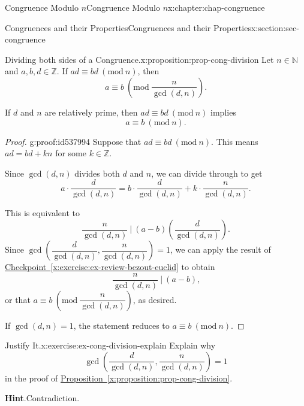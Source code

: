 \documentclass[oneside,10pt,]{book}
\newcommand{\blocktitlefont}{\relax}
\newcommand{\xreffont}{\relax}
\numberwithin{equation}{section}
\newcommand{\Mod}[1]{\ \left(\mathrm{mod}\ #1\right)}
\begin{document}
\begin{chapterptx}{Congruence Modulo \(n\)}{}{Congruence Modulo \(n\)}{}{}{x:chapter:chap-congruence}
\begin{sectionptx}{Congruences and their Properties}{}{Congruences and their Properties}{}{}{x:section:sec-congruence}
\begin{proposition}{Dividing both sides of a Congruence.}{}{x:proposition:prop-cong-division}%
Let \(n \in \mathbb{N}\) and \(a,b,d \in \mathbb{Z}\). If \(ad \equiv bd \Mod{n}\), then%
\begin{equation*}
a \equiv b \Mod{\dfrac{n}{\gcd(d,n)}}\text{.}
\end{equation*}
%
\par
If \(d\) and \(n\) are relatively prime, then \(ad \equiv bd \Mod{n}\) implies%
\begin{equation*}
a \equiv b \Mod{n}\text{.}
\end{equation*}
%
\end{proposition}
\begin{proof}{}{g:proof:id537994}
Suppose that \(ad \equiv bd \Mod{n}\). This means \(ad = bd + kn\) for some \(k \in \mathbb{Z}\).%
\par
Since \(\gcd(d,n)\) divides both \(d\) and \(n\), we can divide through to get%
\begin{equation*}
a\cdot \dfrac{d}{\gcd(d,n)} = b\cdot \dfrac{d}{\gcd(d,n)} + k \cdot\dfrac{n}{\gcd(d,n)}\text{.}
\end{equation*}
%
\par
This is equivalent to%
\begin{equation*}
\dfrac{n}{\gcd(d,n)} \ \Biggl\vert \ (a-b)\left(\dfrac{d}{\gcd(d,n)}\right)\text{.}
\end{equation*}
Since \(\gcd\left(\dfrac{d}{\gcd(d,n)},\dfrac{n}{\gcd(d,n)}\right) = 1\), we can apply the result of \hyperref[x:exercise:ex-review-bezout-euclid]{Checkpoint~{\xreffont\ref{x:exercise:ex-review-bezout-euclid}}} to obtain%
\begin{equation*}
\dfrac{n}{\gcd(d,n)} \ \Biggl\vert \ (a-b)\text{,}
\end{equation*}
or that \(a \equiv b \Mod{\dfrac{n}{\gcd(d,n)}}\), as desired.%
\par
If \(\gcd(d,n) = 1\), the statement reduces to \(a \equiv b \Mod{n}\).%
\end{proof}
\begin{inlineexercise}{Justify It.}{x:exercise:ex-cong-division-explain}%
Explain why%
\begin{equation*}
\gcd\left(\dfrac{d}{\gcd(d,n)},\dfrac{n}{\gcd(d,n)}\right) = 1
\end{equation*}
in the proof of \hyperref[x:proposition:prop-cong-division]{Proposition~{\xreffont\ref{x:proposition:prop-cong-division}}}.%
\par\smallskip%
\noindent\textbf{\blocktitlefont Hint}.\hypertarget{g:hint:id538070}{}\quad{}Contradiction.%

\end{inlineexercise}
\end{sectionptx}
\end{chapterptx}
\end{document}
